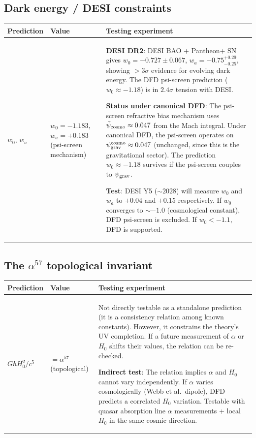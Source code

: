 \documentclass[11pt]{article}
\newcommand{\psigrav}{\psi_{\rm grav}}
\newcommand{\psicosmo}{\bar{\psi}_{\rm cosmo}}
\newcommand{\Hzero}{H_0}
\begin{document}
\subsection{Dark energy / DESI constraints}

\begin{table}[H]
\centering
\begin{tabular}{p{3cm}p{3cm}p{6cm}}
\toprule
\textbf{Prediction} & \textbf{Value} & \textbf{Testing experiment} \\
\midrule
$w_0$, $w_a$ & $w_0 = -1.183$, $w_a = +0.183$ (psi-screen mechanism) &
  \textbf{DESI DR2}: DESI BAO + Pantheon+ SN gives $w_0 = -0.727 \pm 0.067$,
  $w_a = -0.75^{+0.29}_{-0.25}$, showing $>3\sigma$ evidence for evolving
  dark energy. The DFD psi-screen prediction ($w_0 \approx -1.18$) is in
  $2.4\sigma$ tension with DESI.

  \textbf{Status under canonical DFD}: The psi-screen refractive bias
  mechanism uses $\psicosmo \approx 0.047$ from the Mach integral. Under
  canonical DFD, the psi-screen operates on $\psigrav^{\rm cosmo}
  \approx 0.047$ (unchanged, since this is the gravitational sector).
  The prediction $w_0 \approx -1.18$ survives if the psi-screen couples
  to $\psigrav$.

  \textbf{Test}: DESI Y5 ($\sim 2028$) will measure $w_0$ and $w_a$ to
  $\pm 0.04$ and $\pm 0.15$ respectively. If $w_0$ converges to
  $\sim -1.0$ (cosmological constant), DFD psi-screen is excluded.
  If $w_0 < -1.1$, DFD is supported. \\
\bottomrule
\end{tabular}
\end{table}

\subsection{The $\alpha^{57}$ topological invariant}

\begin{table}[H]
\centering
\begin{tabular}{p{3cm}p{3cm}p{6cm}}
\toprule
\textbf{Prediction} & \textbf{Value} & \textbf{Testing experiment} \\
\midrule
$G\hbar\Hzero^2/c^5$ & $= \alpha^{57}$ (topological) &
  Not directly testable as a standalone prediction (it is a
  consistency relation among known constants). However, it constrains
  the theory's UV completion. If a future measurement of $\alpha$
  or $\Hzero$ shifts their values, the relation can be re-checked.

  \textbf{Indirect test}: The relation implies $\alpha$ and $\Hzero$
  cannot vary independently. If $\alpha$ varies cosmologically (Webb
  et al.\ dipole), DFD predicts a correlated $\Hzero$ variation.
  Testable with quasar absorption line $\alpha$ measurements +
  local $\Hzero$ in the same cosmic direction. \\
\bottomrule
\end{tabular}
\end{table}
\end{document}
